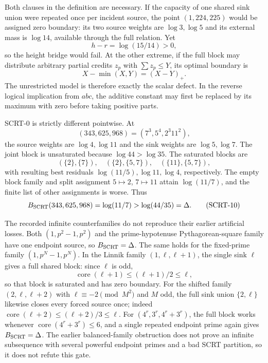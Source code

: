 Both clauses in the definition are necessary.  If the capacity of one
shared sink union were repeated once per incident source, the point
$(1,224,225)$ would be assigned zero boundary: its two source weights are
$\log3,\log5$ and its external mass is $\log14$, available through the full
relation.  Yet
\[
                         h-r=\log(15/14)>0,
\]
so the height bridge would fail.  At the other extreme, if the full block
may distribute arbitrary partial credits $z_p$ with
$\sum z_p\le Y$, its optimal boundary is
\[
 X-\min(X,Y)=(X-Y)_+.                 \tag{SCRT-9}\label{eq:scrt-scalar-collapse}
\]
The unrestricted model is therefore exactly the scalar defect.  In the
reverse logical implication from $abc$, the additive constant may first be
replaced by its maximum with zero before taking positive parts.

SCRT-0 is strictly different pointwise.  At
\[
                         (343,625,968)=(7^3,5^4,2^3 11^2),
\]
the source weights are $\log4,\log11$ and the sink weights are
$\log5,\log7$.  The joint block is unsaturated because $\log44>\log35$.
The saturated blocks are
\[
 (\{2\},\{7\}),\quad(\{2\},\{5,7\}),\quad
 (\{11\},\{5,7\}),
\]
with resulting best residuals $\log(11/5),\log11,\log4$, respectively.
The empty block family and split assignment $5\mapsto2$, $7\mapsto11$
attain $\log(11/7)$, and the finite list of other assignments is worse.
Thus
\[
 B_{\rm SCRT}(343,625,968)=\log(11/7)
 >\log(44/35)=\Delta.                                       \tag{SCRT-10}\label{eq:scrt-noncollapse}
\]

The recorded infinite counterfamilies do not reproduce their earlier
artificial losses.  Both $(1,p^2-1,p^2)$ and the prime-hypotenuse
Pythagorean-square family have one endpoint source, so
$B_{\rm SCRT}=\Delta$.  The same holds for the fixed-prime family
$(1,p^N-1,p^N)$.  In the Linnik family $(1,\ell,\ell+1)$, the single sink
$\ell$ gives a full shared block: since $\ell$ is odd,
\[
 \operatorname{core}(\ell+1)\le(\ell+1)/2\le\ell,
\]
so that block is saturated and has zero boundary.  For the shifted family
$(2,\ell,\ell+2)$ with $\ell\equiv-2\pmod {M^2}$ and $M$ odd, the full sink
union $\{2,\ell\}$ likewise closes every forced source once; indeed
$\operatorname{core}(\ell+2)\le(\ell+2)/3\le\ell$.  For
$(4^r,3^r,4^r+3^r)$, the full block works whenever
$\operatorname{core}(4^r+3^r)\le6$, and a single repeated endpoint prime again gives
$B_{\rm SCRT}=\Delta$.  The earlier balanced-family obstruction does not
prove an infinite subsequence with several powerful endpoint primes and a
bad SCRT partition, so it does not refute this gate.

